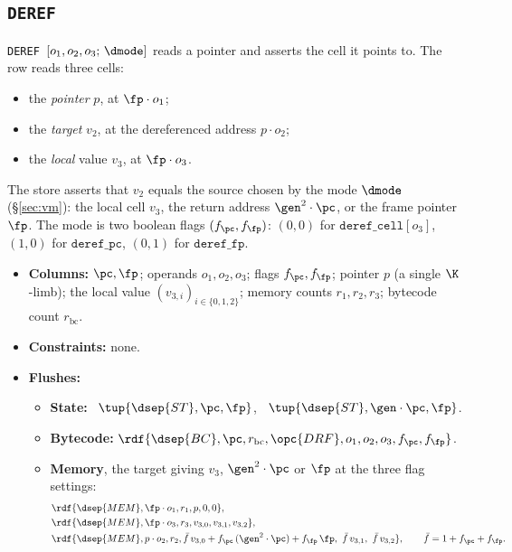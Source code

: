 \subsection{\texttt{DEREF}}\label{sec:tab-deref}

\texttt{DEREF}\ $[o_1,o_2,o_3;\,\dmode]$ reads a pointer and asserts the cell it points to. The row reads three cells:
\begin{itemize}
\item the \emph{pointer} $p$, at $\fp\cdot o_1$;
\item the \emph{target} $v_2$, at the dereferenced address $p\cdot o_2$;
\item the \emph{local} value $v_3$, at $\fp\cdot o_3$.
\end{itemize}
The store asserts that $v_2$ equals the source chosen by the mode $\dmode$ (\S\ref{sec:vm}): the local cell $v_3$, the return address $\gen^{2}\cdot\pc$, or the frame pointer $\fp$. The mode is two boolean flags $(f_{\pc},f_{\fp})$: $(0,0)$ for $\texttt{deref\_cell}[o_3]$, $(1,0)$ for $\texttt{deref\_pc}$, $(0,1)$ for $\texttt{deref\_fp}$.
\begin{itemize}
\item \textbf{Columns:} $\pc,\fp$; operands $o_1,o_2,o_3$; flags $f_{\pc},f_{\fp}$; pointer $p$ (a single $\K$-limb); the local value $(v_{3,i})_{i\in\{0,1,2\}}$; memory counts $r_1,r_2,r_3$; bytecode count $r_{\mathrm{bc}}$.
\item \textbf{Constraints:} none.
\item \textbf{Flushes:}
  \begin{itemize}
  \item \textbf{State:} \pull\ $\tup{\dsep{ST},\pc,\fp}$, \push\ $\tup{\dsep{ST},\gen\cdot\pc,\fp}$.
  \item \textbf{Bytecode:} $\rdf{\dsep{BC},\pc,r_{\mathrm{bc}},\opc{DRF},o_1,o_2,o_3,f_{\pc},f_{\fp}}$.
  \item \textbf{Memory}, the target giving $v_3$, $\gen^{2}\cdot\pc$ or $\fp$ at the three flag settings:
    \begin{align*}
      &\rdf{\dsep{MEM},\fp\cdot o_1,r_1,p,0,0},\\
      &\rdf{\dsep{MEM},\fp\cdot o_3,r_3,v_{3,0},v_{3,1},v_{3,2}},\\
      &\rdf{\dsep{MEM},p\cdot o_2,r_2,\bar f\,v_{3,0}+f_{\pc}\,(\gen^{2}\cdot\pc)+f_{\fp}\,\fp,\ \bar f\,v_{3,1},\ \bar f\,v_{3,2}},
      \qquad \bar f=1+f_{\pc}+f_{\fp}.
    \end{align*}
  \end{itemize}
\end{itemize}

